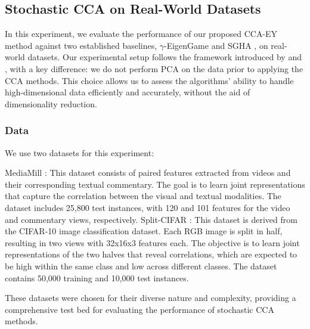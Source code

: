 \subsection{Stochastic CCA on Real-World Datasets}
In this experiment, we evaluate the performance of our proposed CCA-EY method against two established baselines, $\gamma$-EigenGame \citep{gemp2022generalized} and SGHA \citep{chen2019constrained}, on real-world datasets. Our experimental setup follows the framework introduced by \citet{meng2021online} and \citet{gemp2022generalized}, with a key difference: we do not perform PCA on the data prior to applying the CCA methods. This choice allows us to assess the algorithms' ability to handle high-dimensional data efficiently and accurately, without the aid of dimensionality reduction.
\subsubsection{Data}
We use two datasets for this experiment:

MediaMill \citep{gemert2008visual}: This dataset consists of paired features extracted from videos and their corresponding textual commentary. The goal is to learn joint representations that capture the correlation between the visual and textual modalities. The dataset includes 25,800 test instances, with 120 and 101 features for the video and commentary views, respectively.
Split-CIFAR \citep{meng2021online}: This dataset is derived from the CIFAR-10 image classification dataset. Each RGB image is split in half, resulting in two views with 32x16x3 features each. The objective is to learn joint representations of the two halves that reveal correlations, which are expected to be high within the same class and low across different classes. The dataset contains 50,000 training and 10,000 test instances.

These datasets were chosen for their diverse nature and complexity, providing a comprehensive test bed for evaluating the performance of stochastic CCA methods.
